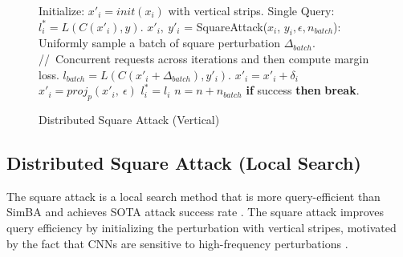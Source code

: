\begin{figure}[tbp]
\begin{minipage}{\textwidth}
\begin{algorithm}[H]
    \centering
    \caption{Distributed Square Attack (Vertical)}
    \label{alg:square_vertical}
    \begin{algorithmic}[1]
            \State Initialize: $x'_{i} = init(x_{i})$ with vertical strips.
            \State Single Query: $l^{*}_i = L(C(x'_i), y)$.
            \State $x'_{i},\ y'_{i}$ = SquareAttack($x_{i}$, $y_{i},\epsilon, n_{batch}$):
            \Indent
                \For {each iteration $n \in [0,\ n_{iter})$}
                    \State Uniformly sample a batch of square perturbation $\Delta_{batch}$.
                    \State //\ Concurrent requests across iterations and then compute margin loss.
                    \State $l_{batch} = L(C(x'_i + \Delta_{batch}), y'_i)$.
                            \State $x'_i = x'_i + \delta_i$
                            \State $x'_i = proj_{p}(x'_i,\ \epsilon)$
                            \State $l^{*}_i = l_i$
                        \EndIf
                    \EndFor
                    \State $n = n + n_{batch}$
                    \State \textbf{if} {success} \textbf{then} {\textbf{break}}.
                \EndFor
            \EndIndent
        \EndFor
    \end{algorithmic}
\end{algorithm}
\end{minipage}
\end{figure}


\subsection{Distributed Square Attack (Local Search)}

The square attack is a local search method that is more query-efficient than SimBA and achieves SOTA attack success rate \cite{andriushchenko2020square}. The square attack improves query efficiency by initializing the perturbation with vertical stripes, motivated by the fact that CNNs are sensitive to high-frequency perturbations \cite{yin2019fourier}. 

